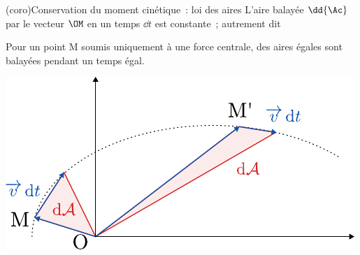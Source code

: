 \documentclass[../../main/main.tex]{subfiles}
\begin{document}
\begin{tcb*}[sidebyside](coro){Conservation du moment cinétique~: loi des aires}
  L'aire balayée $\dd{\Ac}$ par le vecteur $\OM$ en un temps $\dd{t}$ est
  constante~; autrement dit
  \begin{framed}
\setlength{\topsep}{0pt}
      \begin{center}
      Pour un point M soumis uniquement à une force centrale, des aires égales
      sont balayées pendant un temps égal.
    \end{center}
  \end{framed}
  \tcblower
		\begin{center}
			\includegraphics[width=\linewidth]{kepler_2-aire}
		\end{center}
\end{tcb*}
\end{document}
